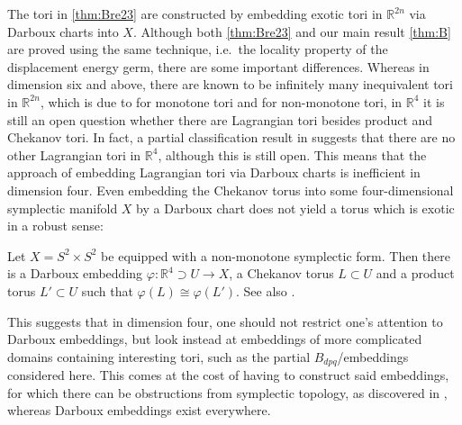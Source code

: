 \documentclass[12pt,a4paper,abstract=true,final]{scrartcl}
\begin{document}
The tori in \cref{thm:Bre23} are constructed by embedding exotic tori in $\mathbb{R}^{2n}$ via Darboux charts into $X$.
Although both \cref{thm:Bre23} and our main result \cref{thm:B} are proved using the same technique, i.e.\ the locality property of the displacement energy germ, there are some important differences.
Whereas in dimension six and above, there are known to be infinitely many inequivalent tori in $\mathbb{R}^{2n}$, which is due to \cite{Aur15} for monotone tori and \cite{brendel2023local} for non-monotone tori, in $\mathbb{R}^4$ it is still an open question whether there are Lagrangian tori besides product and Chekanov tori.
In fact, a partial classification result in \cite{Riz19} suggests that there are no other Lagrangian tori in $\mathbb{R}^4$, although this is still open.
This means that the approach of embedding Lagrangian tori via Darboux charts is inefficient in dimension four.
Even embedding the Chekanov torus into some four-dimensional symplectic manifold $X$ by a Darboux chart does not yield a torus which is exotic in a robust sense:
 
\begin{remark}
    Let $X = S^2 \times S^2$ be equipped with a non-monotone symplectic form.
Then there is a Darboux embedding $\varphi \colon \mathbb{R}^4 \supset U \rightarrow X$, a Chekanov torus $L \subset U$ and a product torus $L' \subset U$ such that $\varphi(L) \cong \varphi(L')$.
See also \cite[Example 5.6]{brendel2023local}.
\end{remark}

This suggests that in dimension four, one should not restrict one's attention to Darboux embeddings, but look instead at embeddings of more complicated domains containing interesting tori, such as the partial $B_{dpq}$\-/embeddings considered here.
This comes at the cost of having to construct said embeddings, for which there can be obstructions from symplectic topology, as discovered in \cite{EvaSmi18}, whereas Darboux embeddings exist everywhere. 
\end{document}
